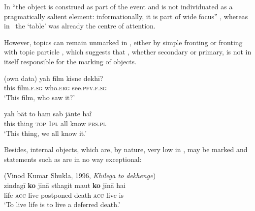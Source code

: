 \documentclass[output=paper]{LSP/langsci}
\begin{document}
In  “the object is construed as part of the event and is not individuated as a pragmatically salient element: informationally, it is part of wide focus” \citep[167]{Dalrympleetal2011Objects}, whereas in~ the ‘table’ was already the centre of attention.

However, topics can remain unmarked in , either by simple fronting  or fronting with topic particle , which suggests that , whether secondary or primary, is not in itself responsible for the marking of objects.

\ea {} (own data) 
\label{10-mo-ex:14}
\ea \label{10-mo-ex:14a}
\gll yah film kisne dekhī?\\
 this film.\textsc{f.sg} who.\textsc{erg} see.\textsc{pfv.f.sg}\\
\glt ‘This film, who saw it?’

\ex 
\label{10-mo-ex:14b}
\gll  yah bāt to ham sab jānte haĩ\\
 this thing \textsc{top} \textsc{1pl} all know \textsc{prs.pl}\\
\glt ‘This thing, we all know it.’
\z
\z

Besides, internal objects, which are, by nature, very low in , may be marked and statements such as  are in no way exceptional: 

\ea  {} (Vinod Kumar Shukla, 1996, \emph{Khilega to dekhenge})\\ %
\label{10-mo-ex:15}
\gll  zindagī \textbf{ko} jīnā sthagit maut \textbf{ko} jīnā hai\\
 life \textsc{acc} live postponed death \textsc{acc} live is\\
\glt ‘To live life is to live a deferred death.’
\z
\end{document}
